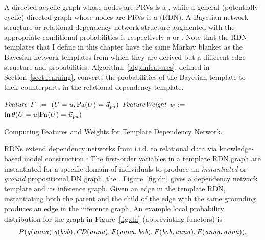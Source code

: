 \documentclass{sfuthesis}
\newcommand{\iid}{i.i.d.}
\begin{document}
A directed acyclic graph whose nodes are PRVs is a , while a general (potentially cyclic) directed graph whose nodes are PRVs is a  (RDN). A Bayesian network structure or relational dependency network structure augmented with the appropriate conditional probabilities is  respectively a  or .  Note that the RDN templates that I  define in this chapter have the same Markov blanket as the Bayesian network templates from which they are derived but a different edge structure and probabilities. Algorithm~\ref{alg:dnfeatures}, defined in Section~\ref{sect:learning}, converts the probabilities of the Bayesian template to their counterparts in the relational dependency template. 

\begin{algorithm}[!h]
{}
\begin{algorithmic}[1]
			\STATE $\it{Feature}$ $F$  $:=$ $(\Appendterm{\UT  = \UV} {\Pa{\UT} = \Prange{\UT}})$ 
			\STATE  $\it{FeatureWeight} $ $w:=$ $\ln\cprob{\UT = \UV}{\Pa{\UT} = \Prange{\UT}}$
			\ENDIF \\	
		\ENDFOR
	\ENDFOR
\ENDFOR 
\ENDFOR
\STATE {}
\end{algorithmic}
\caption{Computing Features and Weights for Template Dependency Network. \label{alg:dnfeatures}}
\end{algorithm}


RDNs extend dependency networks from \iid{} to relational data via knowledge-based model construction \cite{Neville2007}:
The first-order variables in a template RDN graph are instantiated for a specific domain of individuals to produce an {\em  instantiated} or {\em ground} propositional DN graph, the . Figure~\ref{fig:dn} gives a dependency network template and its  inference graph. Given an edge in the template RDN, instantiating both the parent and the child of the edge with the same grounding produces an edge in the inference graph. An example local probability distribution for the graph in Figure~\ref{fig:dn} (abbreviating functors) is
$$P(\it{g(anna)}|\it{g(bob)}, \it{CD(anna)}, \it{F(anna,bob)},\it{F(bob,anna)},\it{F(anna,anna)}).$$
\end{document}
